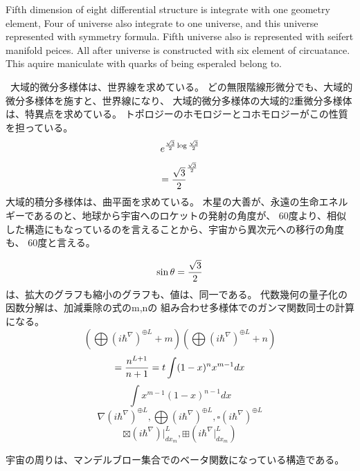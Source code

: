 \documentclass{jsarticle}
\begin{document}
  Fifth dimension of eight differential structure is integrate with one geometry element,
Four of universe also integrate to one universe, and this universe represented with symmetry formula.
Fifth universe also is represented with seifert manifold peices.
All after universe is constructed with six element of circuatance.
This aquire maniculate with quarks of being esperaled belong to.

\
   大域的微分多様体は、世界線を求めている。 
   どの無限階線形微分でも、大域的微分多様体を施すと、世界線になり、
   大域的微分多様体の大域的2重微分多様体は、特異点を求めている。
   トポロジーのホモロジーとコホモロジーがこの性質を担っている。
   $$ e^{{\sqrt{3} \over 2}\log {{\sqrt{3} \over 2}}} $$
   $$ = {\sqrt{3} \over 2}^{{\sqrt{3} \over 2}} $$
   大域的積分多様体は、曲平面を求めている。
   木星の大善が、永遠の生命エネルギーであるのと、地球から宇宙へのロケットの発射の角度が、
   60度より、相似した構造にもなっているのを言えることから、宇宙から異次元への移行の角度も、
   60度と言える。

   $$ \sin \theta = {{\sqrt{3} \over 2}} $$
   は、拡大のグラフも縮小のグラフも、値は、同一である。 
   代数幾何の量子化の因数分解は、加減乗除の式のm,nの
   組み合わせ多様体でのガンマ関数同士の計算になる。
   $$ \left(\bigoplus({i \hbar^{\nabla}})^{\oplus L}+m\right) 
   \left(\bigoplus({i \hbar^{\nabla}})^{\oplus L}+n\right) $$
  $$ = {n^{L+1} \over {n+1}} = t \int (1 - x)^n x^{m - 1} dx $$
  $$ \int x^{m-1}(1 - x)^{n-1} dx $$
  $$ \nabla ({i \hbar^{\nabla}})^{\oplus L}, \bigoplus ({i \hbar^{\nabla}})^{
	   \oplus L}, \square ({i \hbar^{\nabla}})^{\oplus L} $$
   $$ \boxtimes (i \hbar^{\nabla})|_{dx_m}^L, \boxplus (i \hbar^{\nabla}|_
   {dx_m}^L) $$

   宇宙の周りは、マンデルブロー集合でのベータ関数になっている構造である。 
\end{document}
